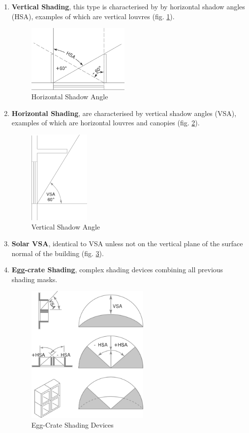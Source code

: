 \begin{enumerate}
  \item	\textbf{Vertical Shading}, this type is characterised by by horizontal shadow angles (HSA),
  examples of which are vertical louvres (fig. \ref{HSA}).
\begin{figure}[htbp]
\centering
\includegraphics[width=5cm]{./Images/5-HSA}
\caption[Horizontal Shadow Angle]{Horizontal Shadow Angle \cite{szokolay08}}
\label{HSA}
\end{figure}
  \item \textbf{Horizontal Shading}, are characterised by vertical shadow angles (VSA), examples of
  which are horizontal louvres and canopies (fig. \ref{VSA}).
\begin{figure}[htbp]
\centering
\includegraphics[width=3cm]{./Images/6-VSA}
\caption[Vertical Shadow Angle]{Vertical Shadow Angle \cite{szokolay08}}
\label{VSA}
\end{figure}
  \item \textbf{Solar VSA}, identical to VSA unless not on the vertical plane of the surface normal
  of the building (fig. \ref{EggCrate}).
  \item \textbf{Egg-crate Shading}, complex shading devices combining all previous shading masks.
\begin{figure}[htbp]
\centering
\includegraphics[width=6cm]{./Images/7-Egg-Crate}
\caption[Egg-Crate Shading Devices]{Egg-Crate Shading Devices \cite{szokolay08}}
\label{EggCrate}
\end{figure}
\end{enumerate}

